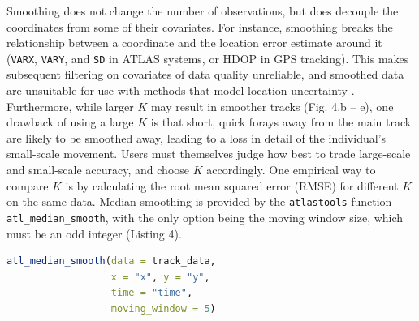 \documentclass[10pt,paper=a4,headings=standardclasses
]{scrartcl}
\begin{document}
Smoothing does not change the number of observations, but does decouple the coordinates from some of their covariates.
For instance, smoothing breaks the relationship between a coordinate and the location error estimate around it (\texttt{VARX}, \texttt{VARY}, and \texttt{SD} in ATLAS systems, or HDOP in GPS tracking).
This makes subsequent filtering on covariates of data quality unreliable, and smoothed data are unsuitable for use with methods that model location uncertainty \citep{noonan2019, fleming2014a, fleming2020, calabrese2016}.
Furthermore, while larger $K$ may result in smoother tracks (Fig. 4.b -- e), one drawback of using a large $K$ is that short, quick forays away from the main track are likely to be smoothed away, leading to a loss in detail of the individual's small-scale movement.
Users must themselves judge how best to trade large-scale and small-scale accuracy, and choose $K$ accordingly.
One empirical way to compare $K$ is by calculating the root mean squared error (RMSE) for different $K$ on the same data.
Median smoothing is provided by the \texttt{atlastools} function \texttt{atl\_median\_smooth}, with the only option being the moving window size, which must be an odd integer (Listing 4).

\begin{lstlisting}[float, language=R, style=customR, caption = {
    Median smoothing a movement track using the function \texttt{atl\_median\_smooth} function with a moving window \textit{K = 5}. 
    Larger values of $K$ yield smoother tracks, but $K$ should always be some orders of magnitude lower than the number of observations.}]
atl_median_smooth(data = track_data,
                  x = "x", y = "y",
                  time = "time",
                  moving_window = 5)
\end{lstlisting}
\end{document}
